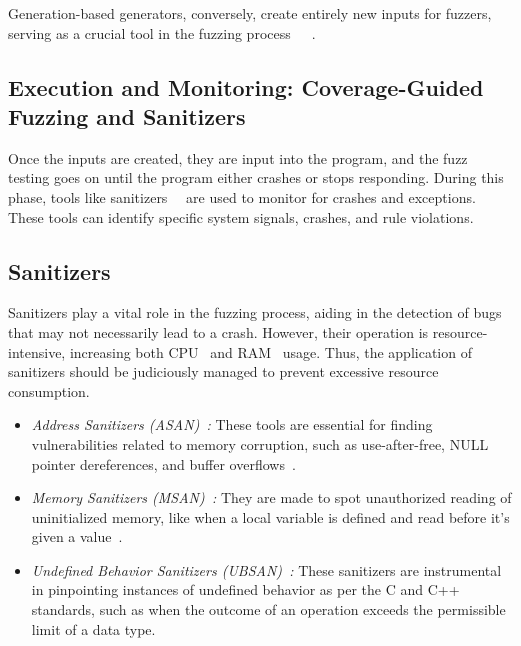 Generation-based generators, conversely, create entirely new inputs
for fuzzers, serving as a crucial tool in the
fuzzing process~\cite{li2018fuzzing}~\cite{miller2007analysis}~\cite{wang2017skyfire}.

\subsection{Execution and Monitoring: Coverage-Guided Fuzzing and Sanitizers}

Once the inputs are created, they are input into the program, and the fuzz
testing goes on until the program either crashes or stops responding. During
this phase, tools like sanitizers~\cite{GitHubgo55:online}~\cite{osterlund2020parmesan}
are used to monitor for crashes and exceptions.
These tools can identify specific system signals, crashes, and rule violations.


\subsection*{Sanitizers}

Sanitizers play a vital role in the fuzzing process, aiding in the detection of
bugs that may not necessarily lead to a crash. However, their operation is
resource-intensive, increasing both CPU~\cite{WhatisaC78:online} and
RAM~\cite{WhatisRA11:online} usage. Thus, the application of
sanitizers should be judiciously managed to prevent excessive resource consumption.

\begin{itemize}

\item \textit{Address Sanitizers (ASAN)~\cite{AddressS43:online}:} These tools
are essential for finding vulnerabilities related to memory corruption, such as
use-after-free, NULL pointer dereferences, and buffer overflows~\cite{haller2013dowsing}.

\item \textit{Memory Sanitizers (MSAN)~\cite{MemorySa64:online}:} They are made
to spot unauthorized reading of uninitialized memory, like when a local variable
is defined and read before it's given a value~\cite{stepanov2015memorysanitizer}.

\item \textit{Undefined Behavior Sanitizers (UBSAN)~\cite{Undefine50:online}:} These sanitizers are instrumental
in pinpointing instances of undefined behavior as per the C and C++ standards,
such as when the outcome of an operation exceeds the permissible limit of a data type.
\end{itemize}


